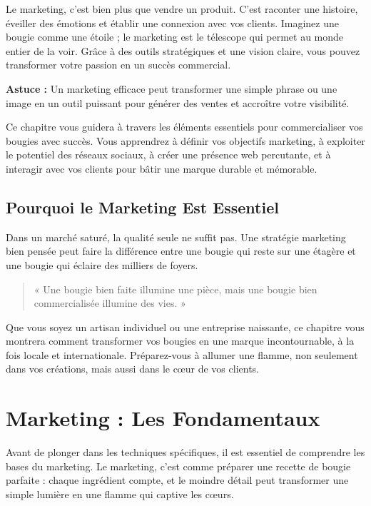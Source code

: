 \documentclass[11pt,fleqn,onecolumn,oneside]{book}
\begin{document}
Le marketing, c’est bien plus que vendre un produit. C’est raconter une histoire, éveiller des émotions et établir une connexion avec vos clients. Imaginez une bougie comme une étoile ; le marketing est le télescope qui permet au monde entier de la voir. Grâce à des outils stratégiques et une vision claire, vous pouvez transformer votre passion en un succès commercial.

\begin{remark}
\textbf{Astuce :} Un marketing efficace peut transformer une simple phrase ou une image en un outil puissant pour générer des ventes et accroître votre visibilité.
\end{remark}

Ce chapitre vous guidera à travers les éléments essentiels pour commercialiser vos bougies avec succès. Vous apprendrez à définir vos objectifs marketing, à exploiter le potentiel des réseaux sociaux, à créer une présence web percutante, et à interagir avec vos clients pour bâtir une marque durable et mémorable.

\subsection*{Pourquoi le Marketing Est Essentiel}

\begin{corollary}
Dans un marché saturé, la qualité seule ne suffit pas. Une stratégie marketing bien pensée peut faire la différence entre une bougie qui reste sur une étagère et une bougie qui éclaire des milliers de foyers.
\end{corollary}

\begin{quote}
« Une bougie bien faite illumine une pièce, mais une bougie bien commercialisée illumine des vies. »
\end{quote}

Que vous soyez un artisan individuel ou une entreprise naissante, ce chapitre vous montrera comment transformer vos bougies en une marque incontournable, à la fois locale et internationale. Préparez-vous à allumer une flamme, non seulement dans vos créations, mais aussi dans le cœur de vos clients.


\section{Marketing : Les Fondamentaux}

Avant de plonger dans les techniques spécifiques, il est essentiel de comprendre les bases du marketing. Le marketing, c’est comme préparer une recette de bougie parfaite : chaque ingrédient compte, et le moindre détail peut transformer une simple lumière en une flamme qui captive les cœurs.
\end{document}
